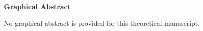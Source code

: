 \documentclass[11pt,a4paper]{article}
\begin{document}
\thispagestyle{empty}

\begin{center}
{\large\bfseries Graphical Abstract}
\end{center}

\bigskip

\noindent
No graphical abstract is provided for this theoretical manuscript.
\end{document}
